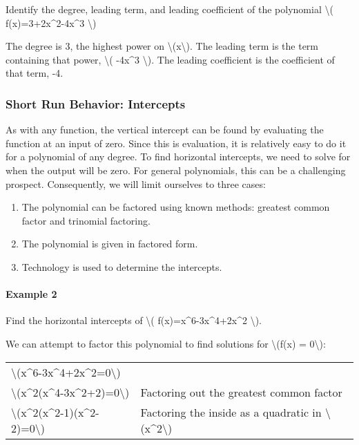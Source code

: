 Identify the degree, leading term, and leading coefficient of the
polynomial \textbackslash{}( f(x)=3+2x\^{}2-4x\^{}3 \textbackslash{})

The degree is 3, the highest power on
\textbackslash{}(x\textbackslash{}). The leading term is the term
containing that power, \textbackslash{}( -4x\^{}3 \textbackslash{}). The
leading coefficient is the coefficient of that term, -4.

\hypertarget{short-run-behavior-intercepts}{%
\subsubsection{Short Run Behavior:
Intercepts}\label{short-run-behavior-intercepts}}

As with any function, the vertical intercept can be found by evaluating
the function at an input of zero. Since this is evaluation, it is
relatively easy to do it for a polynomial of any degree. To find
horizontal intercepts, we need to solve for when the output will be
zero. For general polynomials, this can be a challenging prospect.
Consequently, we will limit ourselves to three cases:

\begin{enumerate}
\tightlist
\item
  The polynomial can be factored using known methods: greatest common
  factor and trinomial factoring.
\item
  The polynomial is given in factored form.
\item
  Technology is used to determine the intercepts.
\end{enumerate}

\hypertarget{example-2}{%
\paragraph{Example 2}\label{example-2}}

Find the horizontal intercepts of \textbackslash{}(
f(x)=x\^{}6-3x\^{}4+2x\^{}2 \textbackslash{}).

We can attempt to factor this polynomial to find solutions for
\textbackslash{}(f(x) = 0\textbackslash{}):

\begin{longtable}[]{@{}ll@{}}
\toprule
\endhead
\textbackslash{}(x\^{}6-3x\^{}4+2x\^{}2=0\textbackslash{})
&\tabularnewline
\textbackslash{}(x\^{}2(x\^{}4-3x\^{}2+2)=0\textbackslash{}) & Factoring
out the greatest common factor\tabularnewline
\textbackslash{}(x\^{}2(x\^{}2-1)(x\^{}2-2)=0\textbackslash{}) &
Factoring the inside as a quadratic in
\textbackslash{}(x\^{}2\textbackslash{})\tabularnewline
\bottomrule
\end{longtable}

